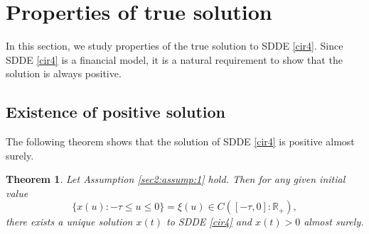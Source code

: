 \documentclass[11pt]{article}
\newtheorem{theorem}[definition]{Theorem}
\begin{document}
\section{Properties of true solution}\label{sect3}
In this section, we study properties of the true solution to SDDE \eqref{cir4}. Since SDDE \eqref{cir4} is a financial model, it is a natural requirement to show that the solution is always positive.
\subsection{Existence of positive solution}
The following theorem shows that the solution of SDDE \eqref{cir4} is positive almost surely.
\begin{theorem}
Let Assumption \ref{sec2:assump:1} hold. Then for any given initial value 
\begin{equation}\label{initial1}
\{ x(u): -\tau\leq u \leq 0\}=\xi(u) \in C([-\tau,0]:\mathbb{R}_+),
\end{equation}
there exists a unique solution $x(t)$ to \textup{SDDE} \eqref{cir4} and $x(t)>0$ almost surely.
\end{theorem}
\end{document}
